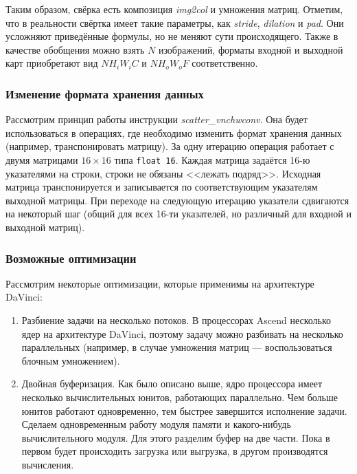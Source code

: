 Таким образом, свёрка есть композиция \textit{img2col} и умножения матриц.
Отметим, что в реальности свёртка имеет такие параметры, как
\textit{stride}, \textit{dilation} и \textit{pad}. Они усложняют
приведённые формулы, но не меняют сути происходящего. Также в
качестве обобщения можно взять $N$ изображений, форматы входной и
выходной карт приобретают вид $N H_i W_i C$ и $N H_o W_o F$ соответственно.

\subsubsection{Изменение формата хранения данных}

Рассмотрим принцип работы инструкции \textit{scatter\_vnchwconv}. Она будет
использоваться в операциях, где необходимо изменить формат хранения данных
(например, транспонировать матрицу). За одну итерацию операция работает с
двумя матрицами $16 \times 16$ типа \texttt{float 16}. Каждая матрица задаётся
16-ю указателями на строки, строки не обязаны <<лежать подряд>>. Исходная
матрица транспонируется и записывается по соответствующим указателям выходной
матрицы. При переходе на следующую итерацию указатели сдвигаются на некоторый
шаг (общий для всех 16-ти указателей, но различный для входной и выходной
матриц).

\subsubsection{Возможные оптимизации}

Рассмотрим некоторые оптимизации, которые применимы на архитектуре DaVinci:

\begin{enumerate}
    \item Разбиение задачи на несколько потоков. В процессорах Ascend несколько
          ядер на архитектуре DaVinci, поэтому задачу можно разбивать на
          несколько параллельных (например, в случае умножения матриц ---
          воспользоваться блочным умножением).
    
    \item Двойная буферизация. Как было описано выше, ядро процессора имеет
          несколько вычислительных юнитов, работающих параллельно. Чем больше
          юнитов работают одновременно, тем быстрее завершится исполнение
          задачи. Сделаем одновременным работу модуля памяти и какого-нибудь
          вычислительного модуля. Для этого разделим буфер на две части. Пока
          в первом будет происходить загрузка или выгрузка, в другом
          производятся вычисления. 
\end{enumerate}

\newpage
